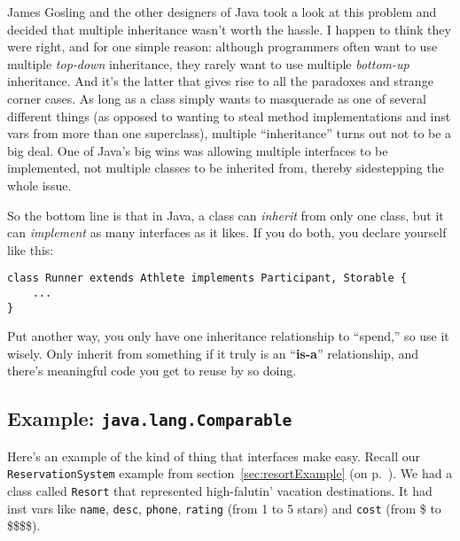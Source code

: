 James Gosling and the other designers of Java took a look at this problem and
decided that multiple inheritance wasn't worth the hassle. I happen to think
they were right, and for one simple reason: although programmers often want to
use multiple \textit{top-down} inheritance, they rarely want to use multiple
\textit{bottom-up} inheritance. And it's the latter that gives rise to all the
paradoxes and strange corner cases. As long as a class simply wants to
masquerade as one of several different things (as opposed to wanting to steal
method implementations and inst vars from more than one superclass), multiple
``inheritance'' turns out not to be a big deal. One of Java's big wins was
allowing multiple interfaces to be implemented, not multiple classes to be
inherited from, thereby sidestepping the whole issue.

\begin{samepage}
So the bottom line is that in Java, a class can \textit{inherit} from only one
class, but it can \textit{implement} as many interfaces as it likes. If you do
both, you declare yourself like this:

\begin{Verbatim}[fontsize=\small,samepage=true,frame=single]
class Runner extends Athlete implements Participant, Storable {
    ...
}
\end{Verbatim}
\end{samepage}

Put another way, you only have one inheritance relationship to ``spend,'' so
use it wisely. Only inherit from something if it truly is an ``\textbf{is-a}''
relationship, and there's meaningful code you get to reuse by so doing.

\subsection{Example: \texttt{java.lang.Comparable}}

Here's an example of the kind of thing that interfaces make easy. Recall our
\texttt{ReservationSystem} example from section~\ref{sec:resortExample} (on
p.~\pageref{sec:resortExample}). We had a class called \texttt{Resort} that
represented high-falutin' vacation destinations. It had inst vars like
\texttt{name}, \texttt{desc}, \texttt{phone}, \texttt{rating} (from 1 to 5
stars) and \texttt{cost} (from \$ to \$\$\$\$).

